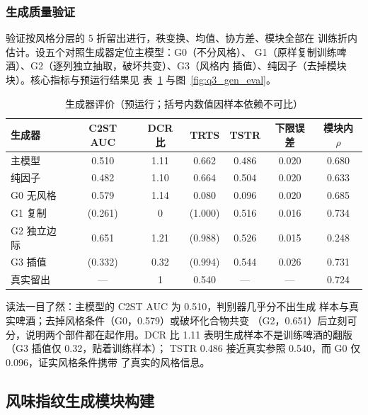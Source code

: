 \documentclass[12pt,a4paper]{article}
\begin{document}
\subsubsection{生成质量验证}

验证按风格分层的 5 折留出进行，秩变换、均值、协方差、模块全部在
训练折内估计。设五个对照生成器定位主模型：G0（不分风格）、
G1（原样复制训练啤酒）、G2（逐列独立抽取，破坏共变）、G3（风格内
插值）、纯因子（去掉模块块）。核心指标与预运行结果见
表~\ref{tab:q3_gen} 与图~\ref{fig:q3_gen_eval}。

\begin{table}[htbp]
  \centering\small
  \caption{生成器评价（预运行；括号内数值因样本依赖不可比）}
  \label{tab:q3_gen}
  \begin{tabular}{lcccccc}
    \toprule
    生成器 & C2ST AUC & DCR 比 & TRTS & TSTR & 下限误差 & 模块内 $\rho$ \\
    \midrule
    主模型 & 0.510 & 1.11 & 0.662 & 0.486 & 0.020 & 0.680 \\
    纯因子 & 0.482 & 1.10 & 0.664 & 0.504 & 0.020 & 0.633 \\
    G0 无风格 & 0.579 & 1.14 & 0.080 & 0.096 & 0.020 & 0.685 \\
    G1 复制 & (0.261) & 0 & (1.000) & 0.516 & 0.016 & 0.734 \\
    G2 独立边际 & 0.651 & 1.21 & (0.988) & 0.526 & 0.015 & 0.248 \\
    G3 插值 & (0.332) & 0.32 & (0.994) & 0.544 & 0.026 & 0.731 \\
    真实留出 & --- & 1 & 0.540 & --- & --- & 0.724 \\
    \bottomrule
  \end{tabular}
\end{table}

读法一目了然：主模型的 C2ST AUC 为 0.510，判别器几乎分不出生成
样本与真实啤酒；去掉风格条件（G0，0.579）或破坏化合物共变
（G2，0.651）后立刻可分，说明两个部件都在起作用。DCR 比 1.11
表明生成样本不是训练啤酒的翻版（G3 插值仅 0.32，贴着训练样本）；
TSTR 0.486 接近真实参照 0.540，而 G0 仅 0.096，证实风格条件携带
了真实的风格信息。


\subsection{风味指纹生成模块构建}
\end{document}
